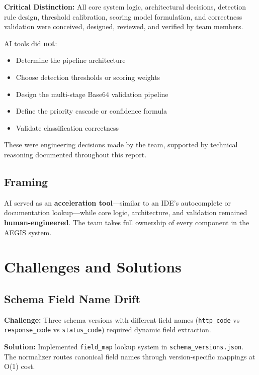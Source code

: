 \documentclass[12pt,a4paper]{article}
\begin{document}
\begin{infobox}
\textbf{Critical Distinction:} All core system logic, architectural decisions, detection rule design, threshold calibration, scoring model formulation, and correctness validation were conceived, designed, reviewed, and verified by team members.

AI tools did \textbf{not}:
\begin{itemize}[noitemsep]
    \item Determine the pipeline architecture
    \item Choose detection thresholds or scoring weights
    \item Design the multi-stage Base64 validation pipeline
    \item Define the priority cascade or confidence formula
    \item Validate classification correctness
\end{itemize}

These were engineering decisions made by the team, supported by technical reasoning documented throughout this report.
\end{infobox}

\subsection{Framing}

AI served as an \textbf{acceleration tool}---similar to an IDE's autocomplete or documentation lookup---while core logic, architecture, and validation remained \textbf{human-engineered}. The team takes full ownership of every component in the AEGIS system.

\section{Challenges and Solutions}

\subsection{Schema Field Name Drift}

\textbf{Challenge:} Three schema versions with different field names (\texttt{http\_code} vs \texttt{response\_code} vs \texttt{status\_code}) required dynamic field extraction.

\textbf{Solution:} Implemented \texttt{field\_map} lookup system in \texttt{schema\_versions.json}. The normalizer routes canonical field names through version-specific mappings at O(1) cost.
\end{document}
